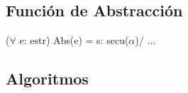 \vspace{33pt}

\subsection*{Funci\'on de Abstracci\'on}
\vspace{11pt}
($\forall$ e: estr) Abs(e) = s: secu($\alpha$)/ ...
\vspace{33pt}

\subsection*{Algoritmos}

